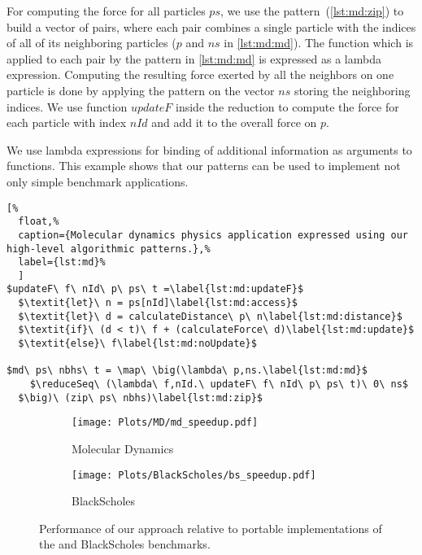 For computing the force for all particles $ps$, we use the \zip pattern~(\autoref{lst:md:zip}) to build a vector of pairs, where each pair combines a single particle with the indices of all of its neighboring particles ($p$ and $ns$ in \autoref{lst:md:md}).
The function which is applied to each pair by the \map pattern in \autoref{lst:md:md} is expressed as a lambda expression.
Computing the resulting force exerted by all the neighbors on one particle is done by applying the \reduceSeq pattern on the vector $ns$ storing the neighboring indices.
We use function $updateF$ inside the reduction to compute the force for each particle with index $nId$ and add it to the overall force on $p$.

We use lambda expressions for binding of additional information as arguments to functions.
This example shows that our patterns can be used to implement not only simple benchmark applications.


\begin{lstlisting}[%
  float,%
  caption={Molecular dynamics physics application expressed using our high-level algorithmic patterns.},%
  label={lst:md}%
  ]
$updateF\ f\ nId\ p\ ps\ t =\label{lst:md:updateF}$
  $\textit{let}\ n = ps[nId]\label{lst:md:access}$
  $\textit{let}\ d = calculateDistance\ p\ n\label{lst:md:distance}$
  $\textit{if}\ (d < t)\ f + (calculateForce\ d)\label{lst:md:update}$
  $\textit{else}\ f\label{lst:md:noUpdate}$

$md\ ps\ nbhs\ t = \map\ \big(\lambda\ p,ns.\label{lst:md:md}$
    $\reduceSeq\ (\lambda\ f,nId.\ updateF\ f\ nId\ p\ ps\ t)\ 0\ ns$
  $\big)\ (zip\ ps\ nbhs)\label{lst:md:zip}$
\end{lstlisting}

\begin{figure}[t]
  \centering
  \begin{subfigure}[b]{0.48\linewidth}
    \texttt{[image: Plots/MD/md\_speedup.pdf]}
    \caption{Molecular Dynamics}
    \label{fig:md:results}
  \end{subfigure}
  \hfill
  \begin{subfigure}[b]{0.48\linewidth}
    \texttt{[image: Plots/BlackScholes/bs\_speedup.pdf]}
    \caption{BlackScholes}
    \label{fig:blackScholes:results}
  \end{subfigure}
  \caption[Performance of our approach relative to native \OpenCL implementations of the \MD and BlackScholes benchmarks]%
          {Performance of our approach relative to portable \OpenCL implementations of the \MD and BlackScholes benchmarks.}
   \label{fig:bs:ms:results}
\end{figure}

